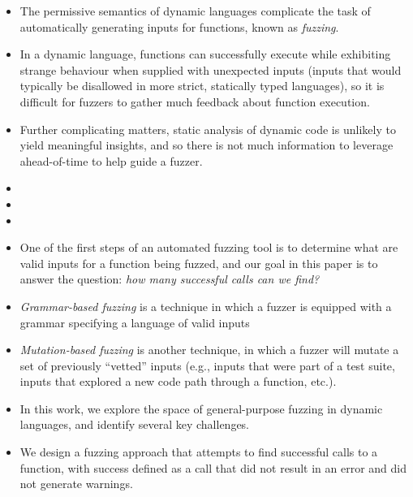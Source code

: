\begin{itemize}
    \item The permissive semantics of dynamic languages complicate the task of automatically generating inputs for functions, known as \textit{fuzzing}.
    \item In a dynamic language, functions can successfully execute while exhibiting strange behaviour when supplied with unexpected inputs (inputs that would typically be disallowed in more strict, statically typed languages), so it is difficult for fuzzers to gather much feedback about function execution.
    \item Further complicating matters, static analysis of dynamic code is unlikely to yield meaningful insights, and so there is not much information to leverage ahead-of-time to help guide a fuzzer.
    \item {}
    \item {}
    \item {}
    \item One of the first steps of an automated fuzzing tool is to determine what are valid inputs for a function being fuzzed, and our goal in this paper is to answer the question: \textit{how many successful calls can we find?}
    \item \textit{Grammar-based fuzzing} is a technique in which a fuzzer is equipped with a grammar specifying a language of valid inputs 
    \item \textit{Mutation-based fuzzing} is another technique, in which a fuzzer will mutate a set of previously ``vetted'' inputs (e.g., inputs that were part of a test suite, inputs that explored a new code path through a function, etc.).
    \item In this work, we explore the space of general-purpose fuzzing in dynamic languages, and identify several key challenges. 
    \item We design a fuzzing approach that attempts to find successful calls to a function, with success defined as a call that did not result in an error and did not generate warnings.

\end{itemize}
